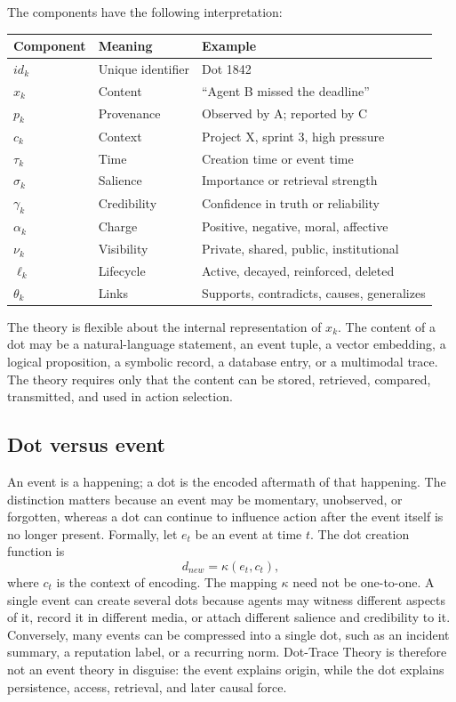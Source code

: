 \documentclass[11pt]{article}
\theoremstyle{remark}
\begin{document}
The components have the following interpretation:

\begin{longtable}[]{@{}lll@{}}
\toprule\noalign{}
Component & Meaning & Example \\
\midrule\noalign{}
\endhead
\bottomrule\noalign{}
\endlastfoot
\(id_k\) & Unique identifier & Dot 1842 \\
\(x_k\) & Content & ``Agent B missed the deadline'' \\
\(p_k\) & Provenance & Observed by A; reported by C \\
\(c_k\) & Context & Project X, sprint 3, high pressure \\
\(\tau_k\) & Time & Creation time or event time \\
\(\sigma_k\) & Salience & Importance or retrieval strength \\
\(\gamma_k\) & Credibility & Confidence in truth or reliability \\
\(\alpha_k\) & Charge & Positive, negative, moral, affective \\
\(\nu_k\) & Visibility & Private, shared, public, institutional \\
\(\ell_k\) & Lifecycle & Active, decayed, reinforced, deleted \\
\(\theta_k\) & Links & Supports, contradicts, causes, generalizes \\
\end{longtable}

The theory is flexible about the internal representation of \(x_k\). The
content of a dot may be a natural-language statement, an event tuple, a
vector embedding, a logical proposition, a symbolic record, a database
entry, or a multimodal trace. The theory requires only that the content
can be stored, retrieved, compared, transmitted, and used in action
selection.

\subsection{Dot versus event}\label{dot-versus-event}

An event is a happening; a dot is the encoded aftermath of that happening. The distinction matters because an event may be momentary, unobserved, or forgotten, whereas a dot can continue to influence action after the event itself is no longer present. Formally, let \(e_t\) be an event at time \(t\). The dot creation function is
\[
d_{new} = \kappa(e_t,c_t),
\]
where \(c_t\) is the context of encoding. The mapping \(\kappa\) need not be one-to-one. A single event can create several dots because agents may witness different aspects of it, record it in different media, or attach different salience and credibility to it. Conversely, many events can be compressed into a single dot, such as an incident summary, a reputation label, or a recurring norm. Dot-Trace Theory is therefore not an event theory in disguise: the event explains origin, while the dot explains persistence, access, retrieval, and later causal force.
\end{document}
